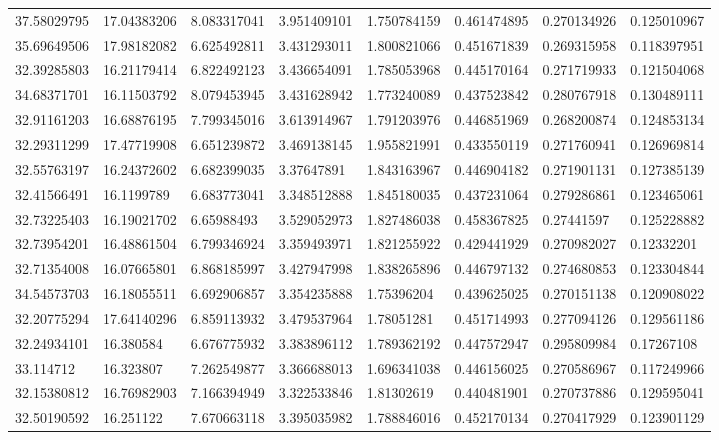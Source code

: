 \begin{landscape}
\begin{longtable}{llllllll}
    37.58029795 & 17.04383206 & 8.083317041 & 3.951409101 & 1.750784159 & 0.461474895 & 0.270134926 & 0.125010967 \\
    35.69649506 & 17.98182082 & 6.625492811 & 3.431293011 & 1.800821066 & 0.451671839 & 0.269315958 & 0.118397951 \\
    32.39285803 & 16.21179414 & 6.822492123 & 3.436654091 & 1.785053968 & 0.445170164 & 0.271719933 & 0.121504068 \\
    34.68371701 & 16.11503792 & 8.079453945 & 3.431628942 & 1.773240089 & 0.437523842 & 0.280767918 & 0.130489111 \\
    32.91161203 & 16.68876195 & 7.799345016 & 3.613914967 & 1.791203976 & 0.446851969 & 0.268200874 & 0.124853134 \\
    32.29311299 & 17.47719908 & 6.651239872 & 3.469138145 & 1.955821991 & 0.433550119 & 0.271760941 & 0.126969814 \\
    32.55763197 & 16.24372602 & 6.682399035 & 3.37647891  & 1.843163967 & 0.446904182 & 0.271901131 & 0.127385139 \\
    32.41566491 & 16.1199789  & 6.683773041 & 3.348512888 & 1.845180035 & 0.437231064 & 0.279286861 & 0.123465061 \\
    32.73225403 & 16.19021702 & 6.65988493  & 3.529052973 & 1.827486038 & 0.458367825 & 0.27441597  & 0.125228882 \\
    32.73954201 & 16.48861504 & 6.799346924 & 3.359493971 & 1.821255922 & 0.429441929 & 0.270982027 & 0.12332201  \\
    32.71354008 & 16.07665801 & 6.868185997 & 3.427947998 & 1.838265896 & 0.446797132 & 0.274680853 & 0.123304844 \\
    34.54573703 & 16.18055511 & 6.692906857 & 3.354235888 & 1.75396204  & 0.439625025 & 0.270151138 & 0.120908022 \\
    32.20775294 & 17.64140296 & 6.859113932 & 3.479537964 & 1.78051281  & 0.451714993 & 0.277094126 & 0.129561186 \\
    32.24934101 & 16.380584   & 6.676775932 & 3.383896112 & 1.789362192 & 0.447572947 & 0.295809984 & 0.17267108  \\
    33.114712   & 16.323807   & 7.262549877 & 3.366688013 & 1.696341038 & 0.446156025 & 0.270586967 & 0.117249966 \\
    32.15380812 & 16.76982903 & 7.166394949 & 3.322533846 & 1.81302619  & 0.440481901 & 0.270737886 & 0.129595041 \\
    32.50190592 & 16.251122   & 7.670663118 & 3.395035982 & 1.788846016 & 0.452170134 & 0.270417929 & 0.123901129 \\

\end{longtable}
\end{landscape}
